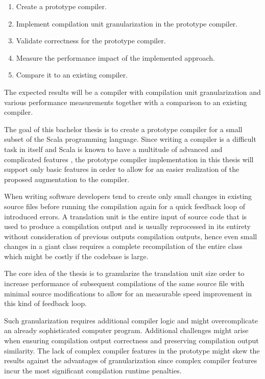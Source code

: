 \documentclass{VUMIFPSbakalaurinis}
\begin{document}
\begin{enumerate}
\item{Create a prototype compiler.}
\item{Implement compilation unit granularization in the prototype compiler.}
\item{Validate correctness for the prototype compiler.}
\item{Measure the performance impact of the implemented approach.}
\item{Compare it to an existing compiler.}
\end{enumerate}

The expected results will be a compiler with compilation unit granularization and various performance measurements together with a comparison to an existing compiler.

The goal of this bachelor thesis is to create a prototype compiler for a small subset of the Scala programming language.
Since writing a compiler is a difficult task in itself and Scala is known to have a multitude of advanced and complicated features \cite{ScalaSpec}, the prototype compiler implementation in this thesis will support only basic features in order to allow for an easier realization of the proposed augmentation to the compiler.

When writing software developers tend to create only small changes in existing source files before running the compilation again for a quick feedback loop of introduced errors.
A translation unit is the entire input of source code that is used to produce a compilation output and is usually reprocessed in its entirety without consideration of previous outputs compilation outputs, hence even small changes in a giant class requires a complete recompilation of the entire class which might be costly if the codebase is large.

The core idea of the thesis is to granularize the translation unit size order to increase performance of subsequent compilations of the same source file with minimal source modifications to allow for an measurable speed improvement in this kind of feedback loop.

Such granularization requires additional compiler logic and might overcomplicate an already sophisticated computer program.
Additional challenges might arise when ensuring compilation output correctness and preserving compilation output similarity.
The lack of complex compiler features in the prototype might skew the results against the advantages of granularization since complex compiler features incur the most significant compilation runtime penalties.
\end{document}
